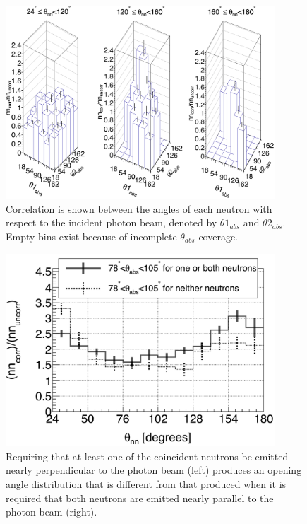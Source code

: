 \begin{figure}
\centering
    \includegraphics[width = 0.9\textwidth]{Content/Results/theta_abs_LEGO.png}
    \caption{Correlation is shown between the angles of each neutron with respect to the incident photon beam, denoted by $\theta 1_{abs}$ and $\theta 2_{abs}$.
    Empty bins exist because of incomplete $\theta_{abs}$ coverage.}
    \label{fig:theta_abs_LEGO}
\end{figure}
\begin{figure}
\centering
\includegraphics[width=0.9\textwidth]{Content/Results/theta_abs_two-neutron.png}
\caption{Requiring that at least one of the coincident neutrons be emitted nearly perpendicular to the photon beam (left) produces an opening angle distribution that is different from that produced when it is required that both neutrons are emitted nearly parallel to the photon beam (right).}
\label{fig:theta_abs_two_neutron}
\end{figure}

